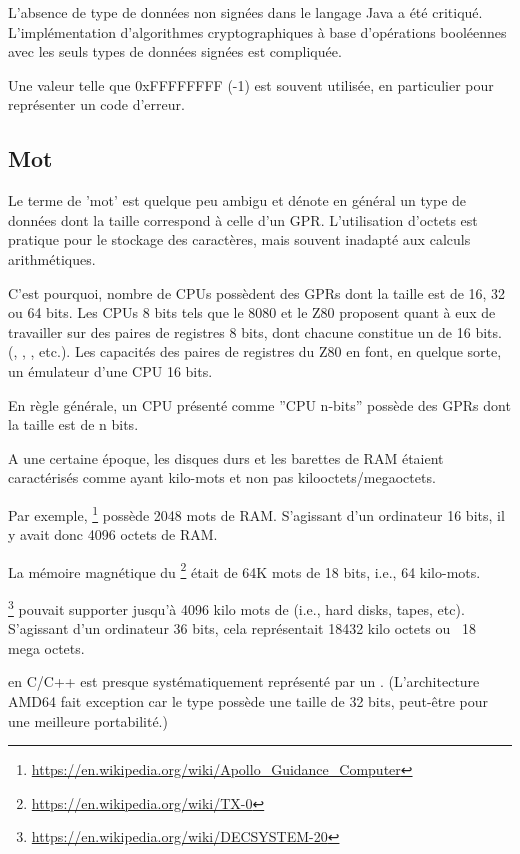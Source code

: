 L'absence de type de données non signées dans le langage Java a été critiqué.
L'implémentation d'algorithmes cryptographiques à base d'opérations booléennes avec les seuls types de données signées est compliquée.

Une valeur telle que 0xFFFFFFFF (-1) est souvent utilisée, en particulier pour représenter un code d'erreur.

\subsection{Mot}

 Le terme de 'mot' est quelque peu ambigu et dénote en général un type de données dont la taille correspond à celle d'un \ac{GPR}.
L'utilisation d'octets est pratique pour le stockage des caractères, mais souvent inadapté aux calculs arithmétiques.

C'est pourquoi, nombre de \ac{CPU}s possèdent des \ac{GPR}s dont la taille est de 16, 32 ou 64 bits.
Les CPUs 8 bits tels que le 8080 et le Z80 proposent quant à eux de travailler sur des paires de registres 8 bits, dont chacune constitue un  de 16 bits.
(, , , etc.).
Les capacités des paires de registres du Z80 en font, en quelque sorte, un émulateur d'une CPU 16 bits.

En règle générale, un CPU présenté comme ''CPU n-bits'' possède des \ac{GPR}s dont la taille est de n bits.

A une certaine époque, les disques durs et les barettes de \ac{RAM} étaient caractérisés comme ayant  kilo-mots
et non pas  kilooctets/megaoctets.

Par exemple, \footnote{\url{https://en.wikipedia.org/wiki/Apollo_Guidance_Computer}}
possède 2048 mots de \ac{RAM}.
S'agissant d'un ordinateur 16 bits, il y avait donc 4096 octets de \ac{RAM}.

La mémoire magnétique du \footnote{\url{https://en.wikipedia.org/wiki/TX-0}} était de 64K mots de 18 bits,
i.e., 64 kilo-mots.

\footnote{\url{https://en.wikipedia.org/wiki/DECSYSTEM-20}}
pouvait supporter jusqu'à 4096 kilo mots de 
(i.e., hard disks, tapes, etc).
S'agissant d'un ordinateur 36 bits, cela représentait 18432 kilo octets ou ~18 mega octets.

\myhrule{}

 en C/C++ est presque systématiquement représenté par un .
(L'architecture AMD64 fait exception car le type  possède une taille de 32 bits, peut-être pour une meilleure portabilité.)

